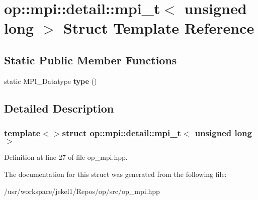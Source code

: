 \hypertarget{structop_1_1mpi_1_1detail_1_1mpi__t_3_01unsigned_01long_01_4}{\section{op\-:\-:mpi\-:\-:detail\-:\-:mpi\-\_\-t$<$ unsigned long $>$ Struct Template Reference}
\label{structop_1_1mpi_1_1detail_1_1mpi__t_3_01unsigned_01long_01_4}
}
\subsection*{Static Public Member Functions}
\begin{DoxyCompactItemize}
\item 
\hypertarget{structop_1_1mpi_1_1detail_1_1mpi__t_3_01unsigned_01long_01_4_a8d964864aa50ef5831788d26be3bb412}{static M\-P\-I\-\_\-\-Datatype {\bfseries type} ()}\label{structop_1_1mpi_1_1detail_1_1mpi__t_3_01unsigned_01long_01_4_a8d964864aa50ef5831788d26be3bb412}

\end{DoxyCompactItemize}


\subsection{Detailed Description}
\subsubsection*{template$<$$>$struct op\-::mpi\-::detail\-::mpi\-\_\-t$<$ unsigned long $>$}



Definition at line 27 of file op\-\_\-mpi.\-hpp.



The documentation for this struct was generated from the following file\-:\begin{DoxyCompactItemize}
\item 
/usr/workspace/jekel1/\-Repos/op/src/op\-\_\-mpi.\-hpp\end{DoxyCompactItemize}
